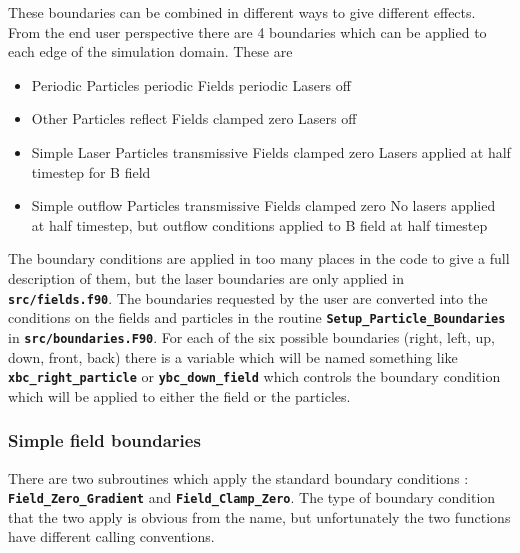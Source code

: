 \documentclass[12pt,a4paper]{article}
\newcommand{\inlinecode}[1]{{\color{warwickred} \bf\texttt{#1}}}
\begin{document}
These boundaries can be combined in different ways to give different
effects. From the end user perspective there are 4 boundaries which can be
applied to each edge of the simulation domain. These are
\begin{itemize}
\item Periodic
  \subitem Particles periodic
  \subitem Fields periodic
  \subitem Lasers off
\item Other
  \subitem Particles reflect
  \subitem Fields clamped zero
  \subitem Lasers off
\item Simple Laser
  \subitem Particles transmissive
  \subitem Fields clamped zero
  \subitem Lasers applied at half timestep for B field
\item Simple outflow
  \subitem Particles transmissive
  \subitem Fields clamped zero
  \subitem No lasers applied at half timestep, but outflow conditions applied
  to B field at half timestep
\end{itemize}
The boundary conditions are applied in too many places in the code to give a
full description of them, but the laser boundaries are only applied in
\inlinecode{src/fields.f90}. The boundaries requested by the user are converted
into the conditions on the fields and particles in the routine
\inlinecode{Setup\_Particle\_Boundaries} in
\inlinecode{src/boundaries.F90}. For each of the six possible boundaries
(right, left, up, down, front, back) there is a variable which will be named
something like \inlinecode{xbc\_right\_particle} or
\inlinecode{ybc\_down\_field} which controls the boundary condition which will
be applied to either the field or the particles.

\subsubsection{Simple field boundaries}
There are two subroutines which apply the standard boundary conditions :
\inlinecode{Field\_Zero\_Gradient} and \inlinecode{Field\_Clamp\_Zero}. The
type of boundary condition that the two apply is obvious from the name, but
unfortunately the two functions have different calling conventions.
\end{document}
